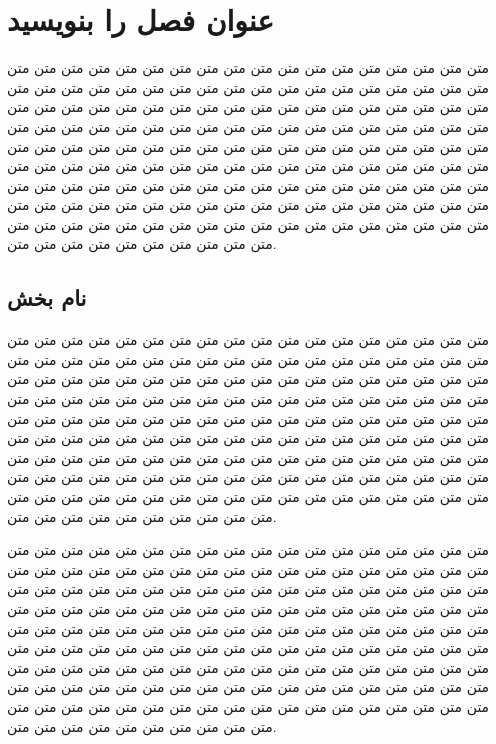 \chapter{عنوان فصل را بنویسید}
متن متن متن متن متن متن متن متن متن متن متن متن متن متن متن متن متن متن متن متن متن متن متن متن متن متن متن متن متن متن متن متن متن متن متن متن متن متن متن متن متن متن متن متن متن متن متن متن متن متن متن متن متن متن متن متن متن متن متن متن متن متن متن متن متن متن متن متن متن متن متن متن متن متن متن متن متن متن متن متن متن متن متن متن متن متن متن متن متن متن متن متن متن متن متن متن متن متن متن متن متن متن متن متن متن متن متن متن متن متن متن متن متن متن متن متن متن متن متن متن متن متن متن متن متن متن متن متن متن متن متن متن متن متن متن متن متن متن متن متن متن متن متن متن متن متن متن متن متن متن متن متن متن متن متن متن متن متن متن متن متن متن متن متن متن متن متن متن متن متن متن متن.
\section{نام بخش}
متن متن متن متن متن متن متن متن متن متن متن متن متن متن متن متن متن متن متن متن متن متن متن متن متن متن متن متن متن متن متن متن متن متن متن متن متن متن متن متن متن متن متن متن متن متن متن متن متن متن متن متن متن متن متن متن متن متن متن متن متن متن متن متن متن متن متن متن متن متن متن متن متن متن متن متن متن متن متن متن متن متن متن متن متن متن متن متن متن متن متن متن متن متن متن متن متن متن متن متن متن متن متن متن متن متن متن متن متن متن متن متن متن متن متن متن متن متن متن متن متن متن متن متن متن متن متن متن متن متن متن متن متن متن متن متن متن متن متن متن متن متن متن متن متن متن متن متن متن متن متن متن متن متن متن متن متن متن متن متن متن متن متن متن متن متن متن متن متن متن متن متن.

متن متن متن متن متن متن متن متن متن متن متن متن متن متن متن متن متن متن متن متن متن متن متن متن متن متن متن متن متن متن متن متن متن متن متن متن متن متن متن متن متن متن متن متن متن متن متن متن متن متن متن متن متن متن متن متن متن متن متن متن متن متن متن متن متن متن متن متن متن متن متن متن متن متن متن متن متن متن متن متن متن متن متن متن متن متن متن متن متن متن متن متن متن متن متن متن متن متن متن متن متن متن متن متن متن متن متن متن متن متن متن متن متن متن متن متن متن متن متن متن متن متن متن متن متن متن متن متن متن متن متن متن متن متن متن متن متن متن متن متن متن متن متن متن متن متن متن متن متن متن متن متن متن متن متن متن متن متن متن متن متن متن متن متن متن متن متن متن متن متن متن متن.

